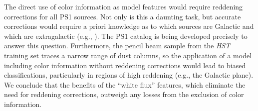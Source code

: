 \documentclass[twocolumn, dvipdfmx]{aastex62}
\begin{document}
The direct use of color information as model features would require reddening
corrections for all PS1 sources. Not only is this a daunting task, but
accurate corrections would require a priori knowledge as to which sources are
Galactic and which are extragalactic (e.g., \citealt{Green15}). The PS1
catalog is being developed precisely to answer this question. Furthermore,
the pencil beam sample from the \textit{HST} training set traces a narrow
range of dust columns, so the application of a model including color
information without reddening corrections would lead to biased
classifications, particularly in regions of high reddening (e.g., the
Galactic plane). We conclude that the benefits of the ``white flux''
features, which eliminate the need for reddening corrections, outweigh any
losses from the exclusion of color information.
\end{document}
